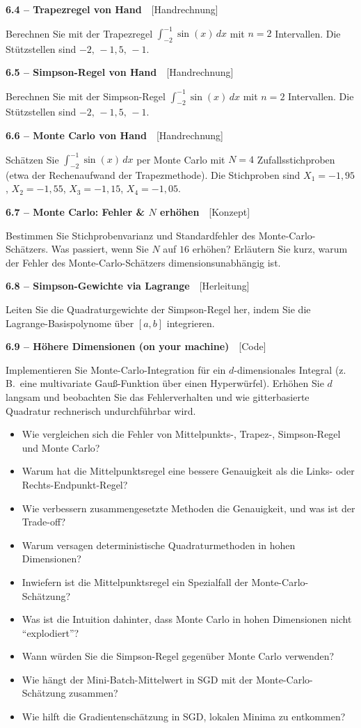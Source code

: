 \documentclass[a4paper,10pt]{article}
\newcommand{\aufg}[2]{%
  \par\vspace{3pt}
  {\bfseries\color{accent2} #1}~~{\footnotesize\color{accent2}[#2]}\par\vspace{1pt}}
\newcommand{\marg}[1]{\par\vspace{1pt}{\footnotesize\itshape Randnotiz: #1}\par}
\newcommand{\reflexion}{%
  \par\vspace{2pt}{\bfseries\color{accent3} Selbstreflexionsfragen}\par\vspace{1pt}}
\begin{document}
\aufg{6.4 \;--\; Trapezregel von Hand}{Handrechnung}
Berechnen Sie mit der Trapezregel $\int_{-2}^{-1}\sin(x)\,dx$ mit $n=2$ Intervallen.
Die Stützstellen sind $-2,\,-1{,}5,\,-1$.

\aufg{6.5 \;--\; Simpson-Regel von Hand}{Handrechnung}
Berechnen Sie mit der Simpson-Regel $\int_{-2}^{-1}\sin(x)\,dx$ mit $n=2$ Intervallen.
Die Stützstellen sind $-2,\,-1{,}5,\,-1$.
\marg{Probieren Sie mehr Intervalle und prüfen Sie sich mit zusammengesetzten
Simpson- und Trapezregeln.}

\aufg{6.6 \;--\; Monte Carlo von Hand}{Handrechnung}
Schätzen Sie $\int_{-2}^{-1}\sin(x)\,dx$ per Monte Carlo mit $N=4$ Zufallsstichproben
(etwa der Rechenaufwand der Trapezmethode). Die Stichproben sind $X_1=-1{,}95$,
$X_2=-1{,}55$, $X_3=-1{,}15$, $X_4=-1{,}05$.

\aufg{6.7 \;--\; Monte Carlo: Fehler \& $N$ erhöhen}{Konzept}
Bestimmen Sie Stichprobenvarianz und Standardfehler des Monte-Carlo-Schätzers. Was
passiert, wenn Sie $N$ auf $16$ erhöhen? Erläutern Sie kurz, warum der Fehler des
Monte-Carlo-Schätzers dimensionsunabhängig ist.

\aufg{6.8 \;--\; Simpson-Gewichte via Lagrange}{Herleitung}
Leiten Sie die Quadraturgewichte der Simpson-Regel her, indem Sie die
Lagrange-Basispolynome über $[a,b]$ integrieren.
\marg{Beginnen Sie mit $x=0$ und sehen Sie, wie die Linearfaktoren ausfallen. Was
passiert, wenn Sie eine lineare Funktion mit einer quadratischen approximieren?}

\aufg{6.9 \;--\; Höhere Dimensionen (on your machine)}{Code}
Implementieren Sie Monte-Carlo-Integration für ein $d$-dimensionales Integral (z.\,B.\
eine multivariate Gauß-Funktion über einen Hyperwürfel). Erhöhen Sie $d$ langsam und
beobachten Sie das Fehlerverhalten und wie gitterbasierte Quadratur rechnerisch
undurchführbar wird.

\reflexion
\begin{itemize}
  \item Wie vergleichen sich die Fehler von Mittelpunkts-, Trapez-, Simpson-Regel und
        Monte Carlo?
  \item Warum hat die Mittelpunktsregel eine bessere Genauigkeit als die Links- oder
        Rechts-Endpunkt-Regel?
  \item Wie verbessern zusammengesetzte Methoden die Genauigkeit, und was ist der
        Trade-off?
  \item Warum versagen deterministische Quadraturmethoden in hohen Dimensionen?
  \item Inwiefern ist die Mittelpunktsregel ein Spezialfall der Monte-Carlo-Schätzung?
  \item Was ist die Intuition dahinter, dass Monte Carlo in hohen Dimensionen nicht
        ``explodiert''?
  \item Wann würden Sie die Simpson-Regel gegenüber Monte Carlo verwenden?
  \item Wie hängt der Mini-Batch-Mittelwert in SGD mit der Monte-Carlo-Schätzung
        zusammen?
  \item Wie hilft die Gradientenschätzung in SGD, lokalen Minima zu entkommen?
\end{itemize}
\end{document}
